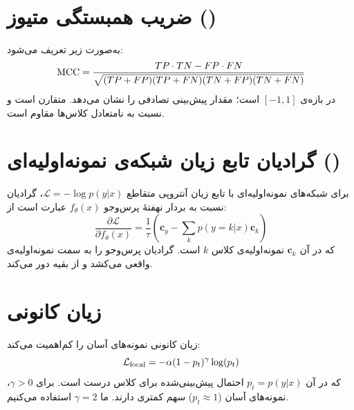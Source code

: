 \section{ضریب همبستگی متیوز ()}

 به‌صورت زیر تعریف می‌شود:
\begin{equation}
\text{MCC} = \frac{TP \cdot TN - FP \cdot FN}{\sqrt{(TP+FP)(TP+FN)(TN+FP)(TN+FN)}}
\end{equation}
 در بازه‌ی $[-1, 1]$ است؛ مقدار  پیش‌بینی تصادفی را نشان می‌دهد. متقارن است و نسبت به نامتعادل کلاس‌ها مقاوم است.

\section{گرادیان تابع زیان شبکه‌ی نمونه‌اولیه‌ای ()}

برای شبکه‌های نمونه‌اولیه‌ای با تابع زیان آنتروپی متقاطع $\mathcal{L} = -\log p(y|x)$، گرادیان نسبت به بردار نهفتۀ پرس‌وجو $f_\theta(x)$ عبارت است از:
\begin{equation}
\frac{\partial \mathcal{L}}{\partial f_\theta(x)} = \frac{1}{\tau} \left( \mathbf{c}_{y} - \sum_{k} p(y=k|x) \mathbf{c}_k \right)
\end{equation}
که در آن $\mathbf{c}_k$ نمونه‌اولیه‌ی کلاس $k$ است. گرادیان پرس‌وجو را به سمت نمونه‌اولیه‌ی واقعی می‌کشد و از بقیه دور می‌کند.

\section{زیان کانونی}

زیان کانونی  نمونه‌های آسان را کم‌اهمیت می‌کند:
\begin{equation}
\mathcal{L}_{\text{focal}} = -\alpha (1-p_t)^\gamma \log(p_t)
\end{equation}
که در آن $p_t = p(y|x)$ احتمال پیش‌بینی‌شده برای کلاس درست است. برای $\gamma > 0$، نمونه‌های آسان ($p_t \approx 1$) سهم کمتری دارند. ما $\gamma = 2$ استفاده می‌کنیم.

